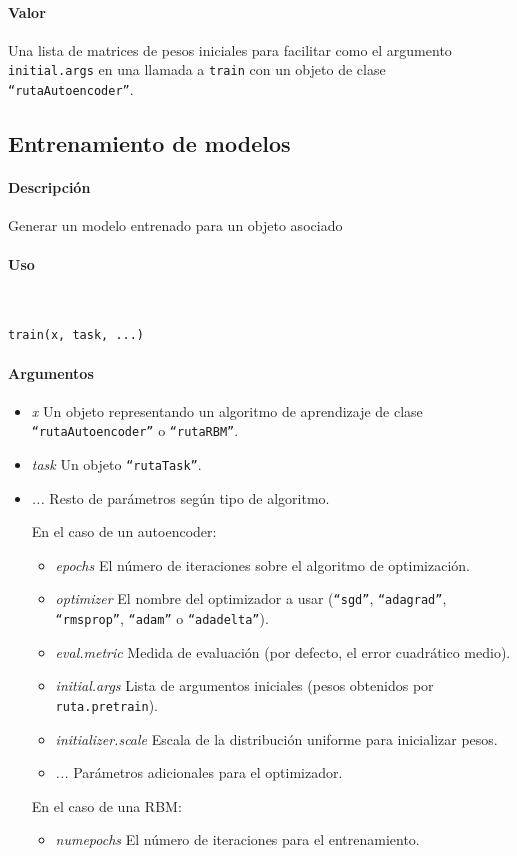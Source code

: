 \paragraph{Valor}
Una lista de matrices de pesos iniciales para facilitar como el argumento \texttt{initial.args} en una llamada a \texttt{train} con un objeto de clase \texttt{``rutaAutoencoder''}.


\subsection{Entrenamiento de modelos}

\paragraph{Descripción}
Generar un modelo entrenado para un objeto asociado 

\paragraph{Uso}
~

\begin{lstlisting}
train(x, task, ...)
\end{lstlisting}

\paragraph{Argumentos}
\begin{itemize}
\item \emph{x}	Un objeto representando un algoritmo de aprendizaje de clase \texttt{``rutaAutoencoder''} o \texttt{``rutaRBM''}.
\item \emph{task}	Un objeto \texttt{``rutaTask''}.
\item \emph{...} Resto de parámetros según tipo de algoritmo.

  En el caso de un autoencoder:
  \begin{itemize}
  \item \emph{epochs}	El número de iteraciones sobre el algoritmo de optimización.
  \item \emph{optimizer} El nombre del optimizador a usar (\texttt{``sgd''}, \texttt{``adagrad''}, \texttt{``rmsprop''}, \texttt{``adam''} o \texttt{``adadelta''}).
  \item \emph{eval.metric} Medida de evaluación (por defecto, el error cuadrático medio).
  \item \emph{initial.args} Lista de argumentos iniciales (pesos obtenidos por \texttt{ruta.pretrain}).
  \item \emph{initializer.scale} Escala de la distribución uniforme para inicializar pesos.
  \item \emph{...} Parámetros adicionales para el optimizador.
  \end{itemize}

  En el caso de una RBM:
  \begin{itemize}
  \item \emph{numepochs} El número de iteraciones para el entrenamiento.
  \end{itemize}
\end{itemize}


